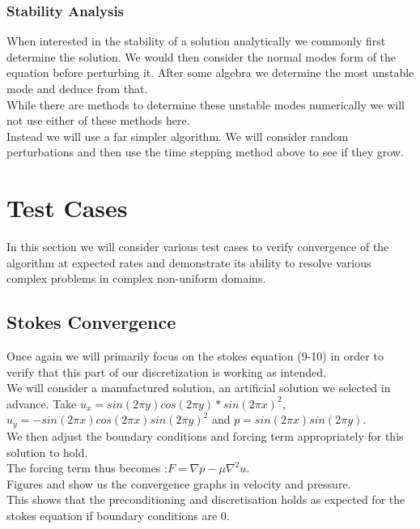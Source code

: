 \documentclass[11pt,twoside,a4paper]{article}
\begin{document}
\subsubsection{Stability Analysis}

When interested in the stability of a solution analytically we commonly first determine the solution. We would then consider the normal modes form of the equation before perturbing it. After some algebra we determine the most unstable mode and deduce from that.\\
While there are methods to determine these unstable modes numerically we will not use either of these methods here.\\
Instead we will use a far simpler algorithm.
We will consider random perturbations and then use the time stepping method above to see if they grow.

\section{Test Cases}
In this section we will consider various test cases to verify convergence of the algorithm at expected rates and demonstrate its ability to resolve various complex problems in complex non-uniform domains. 
\subsection{Stokes Convergence}

Once again we will primarily focus on the stokes equation (9-10) in order to verify that this part of our discretization is working as intended.\\
We will consider a manufactured solution, an artificial solution we selected in advance. Take $u_x = sin(2 \pi y) cos(2 \pi y)*sin(2 \pi x)^2$, $u_y= -sin(2 \pi x) cos(2 \pi x) sin(2 \pi y)^2$ and $p = sin(2 \pi x) sin(2 \pi y)$.\\
We then adjust the boundary conditions and forcing term appropriately for this solution to hold.\\
 The forcing term thus becomes :$F = \nabla p - \mu \nabla^2 u$.\\
Figures and show us the convergence graphs in velocity and pressure.\\
This shows that the preconditioning and discretisation holds as expected for the stokes equation if boundary conditions are $0$.
\\
\end{document}

